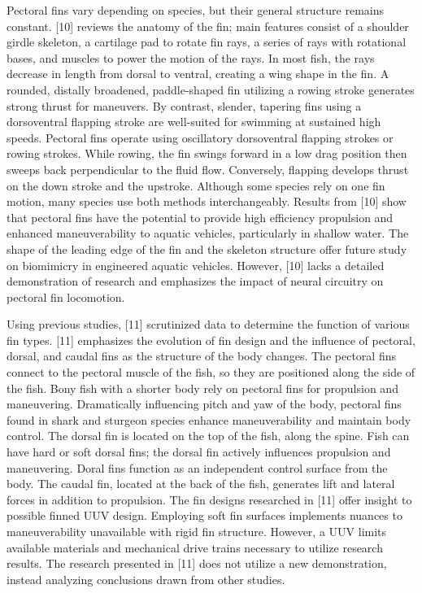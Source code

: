 \documentclass{IEEEtran}
\begin{document}
Pectoral fins vary depending on species, but their general structure remains constant.  [10] reviews the anatomy of the fin; main features consist of a shoulder girdle skeleton, a cartilage pad to rotate fin rays, a series of rays with rotational bases, and muscles to power the motion of the rays.   In most fish, the rays decrease in length from dorsal to ventral, creating a wing shape in the fin.  A rounded, distally broadened, paddle-shaped fin utilizing a rowing stroke generates strong thrust for maneuvers.  By contrast, slender, tapering fins using a dorsoventral flapping stroke are well-suited for swimming at sustained high speeds.  Pectoral fins operate using oscillatory dorsoventral flapping strokes or rowing strokes. While rowing, the fin swings forward in a low drag position then sweeps back perpendicular to the fluid flow.  Conversely, flapping develops thrust on the down stroke and the upstroke.  Although some species rely on one fin motion, many species use both methods interchangeably.  Results from [10] show that pectoral fins have the potential to provide high efficiency propulsion and enhanced maneuverability to aquatic vehicles, particularly in shallow water.  The shape of the leading edge of the fin and the skeleton structure offer future study on biomimicry in engineered aquatic vehicles.  However, [10] lacks a detailed demonstration of research and emphasizes the impact of neural circuitry on pectoral fin locomotion.  

Using previous studies, [11] scrutinized data to determine the function of various fin types.  [11] emphasizes the evolution of fin design and the influence of pectoral, dorsal, and caudal fins as the structure of the body changes.  The pectoral fins connect to the pectoral muscle of the fish, so they are positioned along the side of the fish.  Bony fish with a shorter body rely on pectoral fins for propulsion and maneuvering.  Dramatically influencing pitch and yaw of the body, pectoral fins found in shark and sturgeon species enhance maneuverability and maintain body control.  The dorsal fin is located on the top of the fish, along the spine.  Fish can have hard or soft dorsal fins; the dorsal fin actively influences propulsion and maneuvering.  Doral fins function as an independent control surface from the body.  The caudal fin, located at the back of the fish, generates lift and lateral forces in addition to propulsion.  The fin designs researched in [11] offer insight to possible finned UUV design.  Employing soft fin surfaces implements nuances to maneuverability unavailable with rigid fin structure.  However, a UUV limits available materials and mechanical drive trains necessary to utilize research results.  The research presented in [11] does not utilize a new demonstration, instead analyzing conclusions drawn from other studies.  
\end{document}
